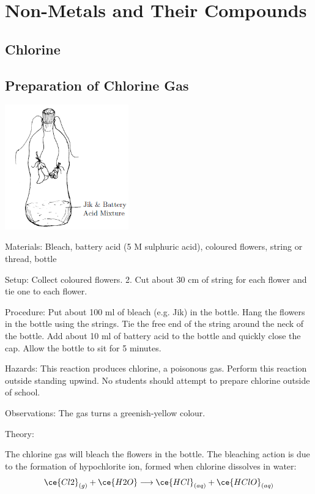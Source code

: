 \section{Non-Metals and Their Compounds}

\begin{multicols}{2}


\section*{Chlorine}


\subsection{Preparation of Chlorine Gas}

\begin{center}
\includegraphics[width=0.4\textwidth]{./img/chlorine.png}
\end{center}

\begin{description*}
\item[Materials:]{Bleach, battery acid (5 M sulphuric acid), coloured 
flowers, string or thread,
bottle}
\item[Setup:]{Collect coloured 
flowers.
2. Cut about 30 cm of string for each 
flower and tie one to each flower.}
\item[Procedure:]{Put about 100 ml of bleach (e.g. Jik) in the bottle. Hang the 
flowers in the bottle using the strings. Tie the free end of
the string around the neck of the bottle. Add about 10 ml of battery acid to the bottle and quickly close the cap. Allow the bottle to sit for 5 minutes.}
\item[Hazards:]{This reaction produces chlorine, a poisonous gas. Perform this reaction
outside standing upwind. No students should attempt to
prepare chlorine outside of school.}
\item[Observations:]{The gas turns a greenish-yellow colour.}
\item[Theory:]{The chlorine gas will bleach the 
flowers in the
bottle. The bleaching action is due to the formation of hypochlorite ion,
formed when chlorine dissolves in water: $$
\ce{Cl2}_{(g)} + \ce{H2O} \longrightarrow \ce{HCl}_{(aq)} + \ce{HClO}_{(aq)} $$

}
\end{description*}
\end{multicols}
